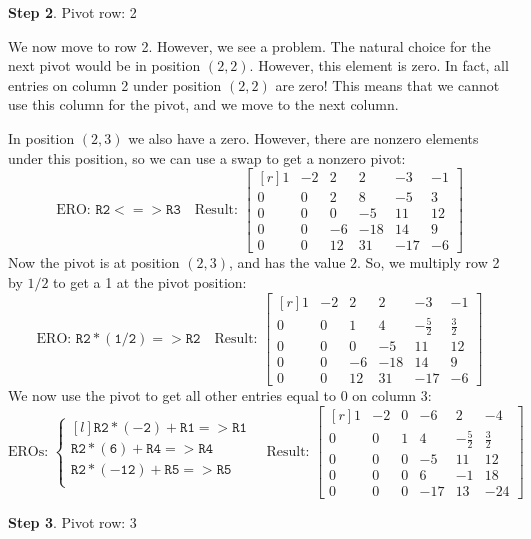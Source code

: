 \documentclass[12pt]{article}
\begin{document}
\begin{example}
\textbf{Step 2}.  Pivot row: 2

We now move to row 2. However, we see a problem. The natural choice for the next pivot would be in position $(2,2)$. However, this element is zero. In fact, all entries on column 2 under position $(2,2)$ are zero! This means that we cannot use this column for the pivot, and we move to the next column.

In position $(2,3)$ we also have a zero. However, there are nonzero elements under this position, so we can use a swap to get a nonzero pivot:
\[
\text{ERO: }\mathtt{R2<=>R3}\quad\text{Result: }
\left[\begin{matrix*}[r]1 & -2 & 2 & 2 & -3 & -1\\0 & 0 & 2 & 8 & -5 & 3\\0 & 0 & 0 & -5 & 11 & 12\\0 & 0 & -6 & -18 & 14 & 9\\0 & 0 & 12 & 31 & -17 & -6\end{matrix*}\right]
\]
Now the pivot is at position $(2,3)$, and has the value $2$. So, we multiply row 2 by $1/2$ to get a 1 at the pivot position:
\[
\text{ERO: }\mathtt{R2*(1/2)=>R2}\quad\text{Result: }
\left[\begin{matrix*}[r]1 & -2 & 2 & 2 & -3 & -1\\0 & 0 & 1 & 4 & - \frac{5}{2} & \frac{3}{2}\\0 & 0 & 0 & -5 & 11 & 12\\0 & 0 & -6 & -18 & 14 & 9\\0 & 0 & 12 & 31 & -17 & -6\end{matrix*}\right]
\]
We now use the pivot to get all other entries equal to 0 on column 3:
\[
\text{EROs: }
\left\{\begin{matrix*}[l]
\mathtt{R2*(-2)+R1=>R1}\\
\mathtt{R2*(6)+R4=>R4}\\
\mathtt{R2*(-12)+R5=>R5}\\
\end{matrix*}\right.
\quad 
\text{Result: }
\left[\begin{matrix*}[r]1 & -2 & 0 & -6 & 2 & -4\\0 & 0 & 1 & 4 & - \frac{5}{2} & \frac{3}{2}\\0 & 0 & 0 & -5 & 11 & 12\\0 & 0 & 0 & 6 & -1 & 18\\0 & 0 & 0 & -17 & 13 & -24\end{matrix*}\right]
\]

\textbf{Step 3}. Pivot row: 3


\end{example}
\end{document}

